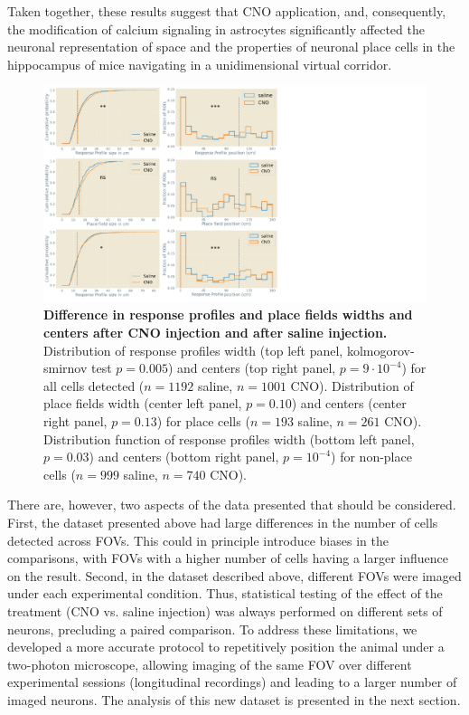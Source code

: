 Taken together, these results suggest that CNO application, and, consequently, the modification of calcium signaling in astrocytes significantly affected the neuronal representation of space and the properties of neuronal place cells in the hippocampus of mice navigating in a unidimensional virtual corridor. 
\begin{figure}[h]
    \centering
    \includegraphics[trim={0 0 360 0},clip,width=\textwidth]{Figures/Chapter4/pf_width_center_2p.pdf}
    \caption[Difference in response profiles and place fields widths and centers after CNO injection and after saline injection]{\textbf{Difference in response profiles and place fields widths and centers after CNO injection and after saline injection.} 
    Distribution of response profiles width (top left panel, kolmogorov-smirnov test $p=0.005$) and centers (top right panel, $p=9 \cdot 10^{-4}$) for all cells detected ($n=1192$ saline, $n=1001$ CNO). 
    Distribution of place fields width (center left panel, $p=0.10$) and centers (center right panel, $p=0.13$) for place cells ($n=193$ saline, $n=261$ CNO).
    Distribution function of response profiles width (bottom left panel, $p=0.03$) and centers (bottom right panel, $p=10^{-4}$) for non-place cells ($n=999$ saline, $n=740$ CNO).}
    \label{fig:chap4:width_center_2p}
\end{figure}
There are, however, two aspects of the data presented that should be considered. 
First, the dataset presented above had large differences in the number of cells detected across FOVs. 
This could in principle introduce biases in the comparisons, with FOVs with a higher number of cells having a larger influence on the result. 
Second, in the dataset described above, different FOVs were imaged under each experimental condition.
Thus, statistical testing of the effect of the treatment (CNO vs. saline injection) was always performed on different sets of neurons, precluding a paired comparison.
To address these limitations, we developed a more accurate protocol to repetitively position the animal under a two-photon microscope, allowing imaging of the same FOV over different experimental sessions (longitudinal recordings) and leading to a larger number of imaged neurons. 
The analysis of this new dataset is presented in the next section.

